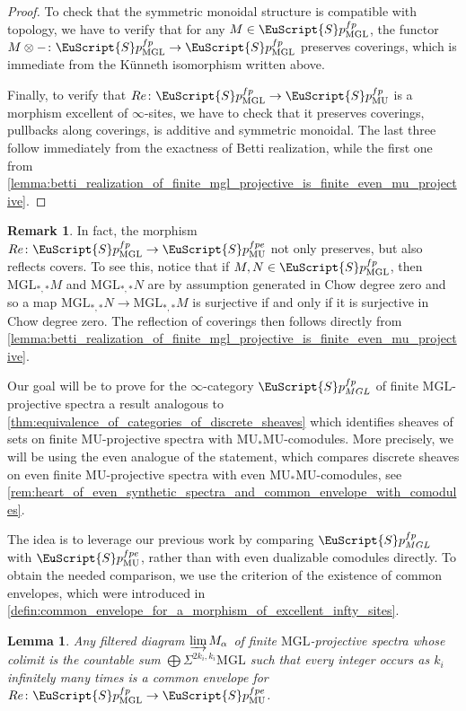 \documentclass[oneside,a4paper]{amsart}
\newcommand{\euscr}[1]{\EuScript{#1}} %
\newcommand{\MU}{\mathrm{MU}} %
\newcommand{\MGL}{\mathrm{MGL}} %
\newcommand{\spectra}{\euscr{S}p} %
\newcommand{\spectramglfp}{\spectra_{MGL}^{fp}} %
\newcommand{\spectramufpe}{\spectra_{\MU}^{fpe}} %
\theoremstyle{plain}
\newtheorem{lemma}[thm]{Lemma}
\theoremstyle{definition}
\newtheorem{rem}[thm]{Remark}
\theoremstyle{remark}
\begin{document}
\begin{proof}
To check that the symmetric monoidal structure is compatible with topology, we have to verify that for any $M \in \spectra_{\MGL}^{fp}$, the functor $M \otimes - \colon \spectra_{\MGL}^{fp} \rightarrow \spectra_{\MGL}^{fp}$ preserves coverings, which is immediate from the K\"{u}nneth isomorphism written above. 

Finally, to verify that $Re \colon \spectra_{\MGL}^{fp} \rightarrow \spectra_{\MU}^{fp}$ is a morphism excellent of $\infty$-sites, we have to check that it preserves coverings, pullbacks along coverings, is additive and symmetric monoidal. The last three follow immediately from the exactness of Betti realization, while the first one from \cref{lemma:betti_realization_of_finite_mgl_projective_is_finite_even_mu_projective}.
\end{proof}

\begin{rem}
\label{rem:betti_realization_reflects_covers_of_projective_mspectra}
In fact, the morphism $Re \colon \spectra_{\MGL}^{fp} \rightarrow \spectra_{\MU}^{fpe}$ not only preserves, but also reflects covers. To see this, notice that if $M, N \in \spectra_{\MGL}^{fp}$, then $\MGL_{*, *} M$ and $\MGL_{*, *}N$ are by assumption generated in Chow degree zero and so a map $\MGL_{*, *} N \rightarrow \MGL_{*, *} M$ is surjective if and only if it is surjective in Chow degree zero. The reflection of coverings then follows directly from \cref{lemma:betti_realization_of_finite_mgl_projective_is_finite_even_mu_projective}.
\end{rem}

Our goal will be to prove for the $\infty$-category $\spectramglfp$ of finite $\MGL$-projective spectra a result analogous to \cref{thm:equivalence_of_categories_of_discrete_sheaves} which identifies sheaves of sets on finite $\MU$-projective spectra with $\MU_{*}\MU$-comodules. More precisely, we will be using the even analogue of the statement, which compares discrete sheaves on even finite $\MU$-projective spectra with even $\MU_{*}\MU$-comodules, see \cref{rem:heart_of_even_synthetic_spectra_and_common_envelope_with_comodules}. 

The idea is to leverage our previous work by comparing $\spectramglfp$ with $\spectramufpe$, rather than with even dualizable comodules directly. To obtain the needed comparison, we use the criterion of the existence of common envelopes, which were introduced in \cref{defin:common_envelope_for_a_morphism_of_excellent_infty_sites}.

\begin{lemma}
\label{lemma:common_envelope_for_betti_realization}
Any filtered diagram $\varinjlim M_{\alpha}$ of finite $\MGL$-projective spectra whose colimit is the countable sum $\bigoplus \Sigma^{2k_{i}, k_{i}} \MGL$ such that every integer occurs as $k_{i}$ infinitely many times is a common envelope for $Re \colon \spectra_{\MGL}^{fp} \rightarrow \spectra_{\MU}^{fpe}$. 
\end{lemma}
\end{document}

